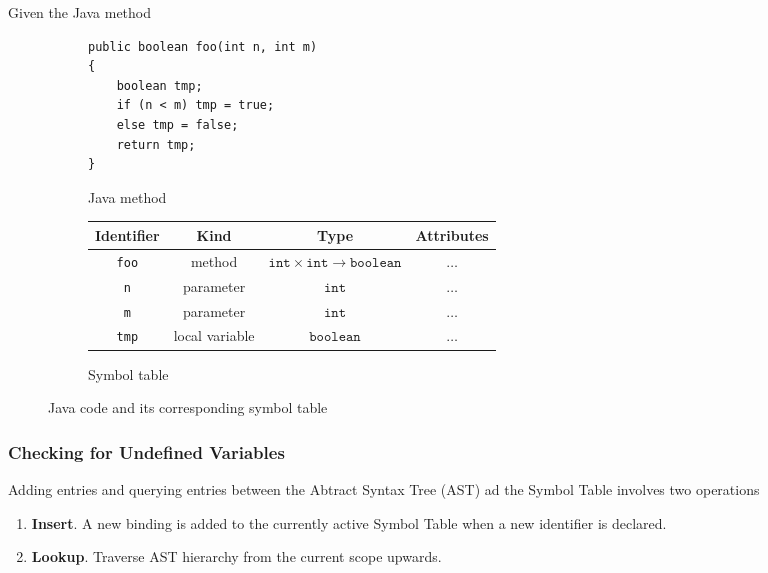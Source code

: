 \begin{example}
    Given the Java method
    \begin{figure}[H]
        \centering
        \begin{subfigure}{\textwidth}
            \centering
            \begin{verbatim}
public boolean foo(int n, int m)
{
    boolean tmp;
    if (n < m) tmp = true;
    else tmp = false;
    return tmp;
}
            \end{verbatim}
            \caption{Java method}
        \end{subfigure}
        \begin{subfigure}{\textwidth}
            \centering
            \begin{tabular}{@{} c c c c @{}}
                \toprule
                Identifier & Kind & Type & Attributes \\
                \midrule
                \texttt{foo} & method & $\texttt{int} \times \texttt{int} \to \texttt{boolean}$ & $\dots$ \\
                \texttt{n} & parameter & $\texttt{int}$ & $\dots$ \\
                \texttt{m} & parameter & $\texttt{int}$ & $\dots$ \\
                \texttt{tmp} & local variable & $\texttt{boolean}$ & $\dots$ \\
                \bottomrule
            \end{tabular}
            \caption{Symbol table}
        \end{subfigure}
        \caption{Java code and its corresponding symbol table}
        \label{prog:symbol-table}
    \end{figure}
\end{example}

\subsubsection{Checking for Undefined Variables}

\begin{definition}
    Adding entries and querying entries between the Abtract Syntax Tree (AST) ad the Symbol Table involves two operations
    \begin{enumerate}
        \item \textbf{Insert}. A new binding is added to the currently active Symbol Table when a new identifier is declared.
        \item \textbf{Lookup}. Traverse AST hierarchy from the current scope upwards.
    \end{enumerate}
\end{definition}

